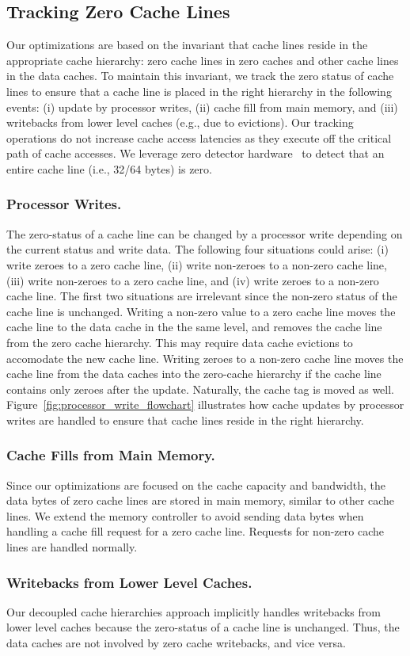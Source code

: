 \subsection{Tracking Zero Cache Lines}

Our optimizations are based on the invariant that cache lines reside in the appropriate cache hierarchy: zero cache lines in zero caches and other cache lines in the data caches. To maintain this invariant, we track the zero status of cache lines to ensure that a cache line is placed in the right hierarchy in the following events: (i) update by processor writes, (ii) cache fill from main memory, and (iii) writebacks from lower level caches (e.g., due to evictions). Our tracking operations do not increase cache access latencies as they execute off the critical path of cache accesses. We leverage zero detector hardware~\cite{Dusser09} to detect that an entire cache line (i.e., 32/64 bytes) is zero.

\subsubsection{Processor Writes.}

The zero-status of a cache line can be changed by a processor write depending on the current status and write data.  The following four situations could arise: (i) write zeroes to a zero cache line, (ii) write non-zeroes to a non-zero cache line, (iii) write non-zeroes to a zero cache line, and (iv) write zeroes to a non-zero cache line.  The first two situations are irrelevant since the non-zero status of the cache line is unchanged.  Writing a non-zero value to a zero cache line moves the cache line to the data cache in the the same level, and removes the cache line from the zero cache hierarchy.  This may require data cache evictions to accomodate the new cache line.  Writing zeroes to a non-zero cache line moves the cache line from the data caches into the zero-cache hierarchy if the cache line contains only zeroes after the update.  Naturally, the cache tag is moved as well.  Figure~\ref{fig:processor_write_flowchart} illustrates how cache updates by processor writes are handled to ensure that cache lines reside in the right hierarchy.  

\subsubsection{Cache Fills from Main Memory.} 

Since our optimizations are focused on the cache capacity and bandwidth, the data bytes of zero cache lines are stored in main memory, similar to other cache lines.  We extend the memory controller to avoid sending data bytes when handling a cache fill request for a zero cache line.  Requests for non-zero cache lines are handled normally. 

\subsubsection{Writebacks from Lower Level Caches.}

Our decoupled cache hierarchies approach implicitly handles writebacks from lower level caches because the zero-status of a cache line is unchanged.  Thus, the data caches are not involved by zero cache writebacks, and vice versa.   


